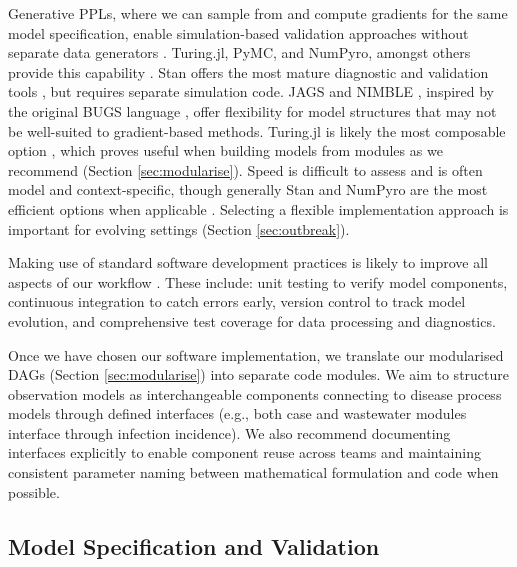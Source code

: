 \documentclass{article}
\begin{document}
Generative \ac{PPL}s, where we can sample from and compute gradients for the same model specification, enable simulation-based validation approaches without separate data generators  \citet{vstrumbelj2024past}.
Turing.jl, PyMC, and NumPyro, amongst others provide this capability \citep{ge2018turing,fjelde2025turing,abril2023pymc,phan2019composable}.
Stan offers the most mature diagnostic and validation tools \citep{carpenter2017stan}, but requires separate simulation code.
JAGS and NIMBLE \citep{plummer2003jags,de2017programming}, inspired by the original BUGS language \citep{lunn2013bugs}, offer flexibility for model structures that may not be well-suited to gradient-based methods.
Turing.jl is likely the most composable option \citep{ge2018turing}, which proves useful when building models from modules as we recommend (Section \ref{sec:modularise}).
Speed is difficult to assess and is often model and context-specific, though generally Stan and NumPyro are the most efficient options when applicable \citep{carpenter2017stan,phan2019composable}.
Selecting a flexible implementation approach is important for evolving settings (Section \ref{sec:outbreak}).

Making use of standard software development practices is likely to improve all aspects of our workflow \citep{gelman2020bayesian}.
These include: unit testing to verify model components, continuous integration to catch errors early, version control to track model evolution, and comprehensive test coverage for data processing and diagnostics.


Once we have chosen our software implementation, we translate our modularised \ac{DAG}s (Section \ref{sec:modularise}) into separate code modules.
We aim to structure observation models as interchangeable components connecting to disease process models through defined interfaces (e.g., both case and wastewater modules interface through infection incidence). We also recommend documenting interfaces explicitly to enable component reuse across teams and maintaining consistent parameter naming between mathematical formulation and code when possible.

\subsection{Model Specification and Validation}\label{sec:spec-validate}
\end{document}

